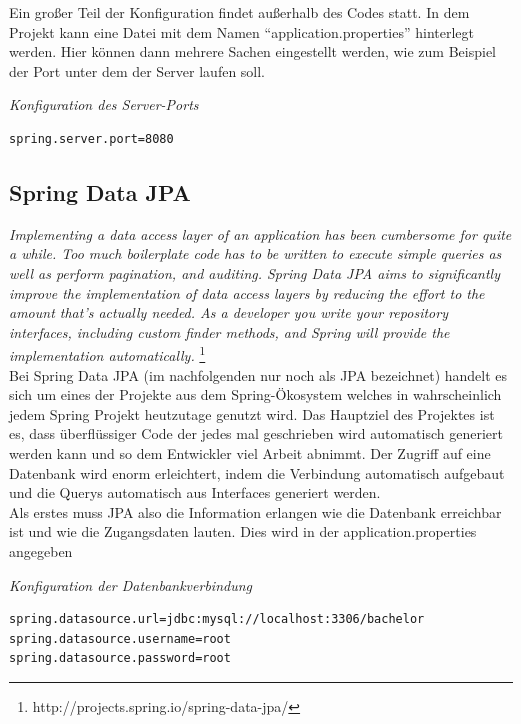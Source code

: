 Ein großer Teil der Konfiguration findet außerhalb des Codes statt. In dem Projekt kann eine Datei mit dem Namen ``application.properties'' hinterlegt werden. Hier können dann mehrere Sachen eingestellt werden, wie zum Beispiel der Port unter dem der Server laufen soll.

\begin{minipage}{\textwidth}
\emph{Konfiguration des Server-Ports}
\begin{lstlisting}
spring.server.port=8080
\end{lstlisting} 
\end{minipage}

\subsection{Spring Data JPA}

\emph{\glqq   
Implementing a data access layer of an application has been cumbersome for quite a while. Too much boilerplate code has to be written to execute simple queries as well as perform pagination, and auditing. Spring Data JPA aims to significantly improve the implementation of data access layers by reducing the effort to the amount that’s actually needed. As a developer you write your repository interfaces, including custom finder methods, and Spring will provide the implementation automatically.
\grqq} \footnote{http://projects.spring.io/spring-data-jpa/} \\

Bei Spring Data JPA (im nachfolgenden nur noch als JPA bezeichnet) handelt es sich um eines der Projekte aus dem Spring-Ökosystem welches in wahrscheinlich jedem Spring Projekt heutzutage genutzt wird. Das Hauptziel des Projektes ist es, dass überflüssiger Code der jedes mal geschrieben wird automatisch generiert werden kann und so dem Entwickler viel Arbeit abnimmt. Der Zugriff auf eine Datenbank wird enorm erleichtert, indem die Verbindung automatisch aufgebaut und die Querys automatisch aus Interfaces generiert werden. \\
Als erstes muss JPA also die Information erlangen wie die Datenbank erreichbar ist und wie die Zugangsdaten lauten. Dies wird in der application.properties angegeben \\

\begin{minipage}{\textwidth}
\emph{Konfiguration der Datenbankverbindung}
\begin{lstlisting}
spring.datasource.url=jdbc:mysql://localhost:3306/bachelor
spring.datasource.username=root
spring.datasource.password=root
\end{lstlisting} 
\end{minipage}

